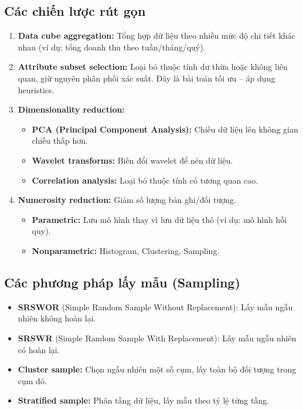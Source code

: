 \documentclass[10pt]{article}
\begin{document}
\subsection{Các chiến lược rút gọn}

\begin{enumerate}
    \item \textbf{Data cube aggregation:} Tổng hợp dữ liệu theo nhiều mức độ chi tiết khác nhau (ví dụ: tổng doanh thu theo tuần/tháng/quý).
    \item \textbf{Attribute subset selection:} Loại bỏ thuộc tính dư thừa hoặc không liên quan, giữ nguyên phân phối xác suất. Đây là bài toán tối ưu -- áp dụng heuristics.
    \item \textbf{Dimensionality reduction:}
    \begin{itemize}
        \item \textbf{PCA (Principal Component Analysis):} Chiếu dữ liệu lên không gian chiều thấp hơn.
        \item \textbf{Wavelet transforms:} Biến đổi wavelet để nén dữ liệu.
        \item \textbf{Correlation analysis:} Loại bỏ thuộc tính có tương quan cao.
    \end{itemize}
    \item \textbf{Numerosity reduction:} Giảm số lượng bản ghi/đối tượng.
    \begin{itemize}
        \item \textbf{Parametric:} Lưu mô hình thay vì lưu dữ liệu thô (ví dụ: mô hình hồi quy).
        \item \textbf{Nonparametric:} Histogram, Clustering, Sampling.
    \end{itemize}
\end{enumerate}

\subsection{Các phương pháp lấy mẫu (Sampling)}

\begin{itemize}
    \item \textbf{SRSWOR} (Simple Random Sample Without Replacement): Lấy mẫu ngẫu nhiên không hoàn lại.
    \item \textbf{SRSWR} (Simple Random Sample With Replacement): Lấy mẫu ngẫu nhiên có hoàn lại.
    \item \textbf{Cluster sample:} Chọn ngẫu nhiên một số cụm, lấy toàn bộ đối tượng trong cụm đó.
    \item \textbf{Stratified sample:} Phân tầng dữ liệu, lấy mẫu theo tỷ lệ từng tầng.
\end{itemize}
\end{document}
